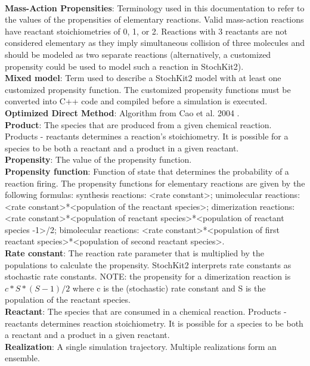 \documentclass[11pt,letterpaper]{article}
\begin{document}
\\\textbf{Mass-Action Propensities}: Terminology used in this documentation to refer to the values of the propensities of elementary reactions.  Valid mass-action reactions have reactant stoichiometries of 0, 1, or 2.  Reactions with 3 reactants are not considered elementary as they imply simultaneous collision of three molecules and should be modeled as two separate reactions (alternatively, a customized propensity could be used to model such a reaction in StochKit2).
    \\\textbf{Mixed model}: Term used to describe a StochKit2 model with at least one customized propensity function.  The customized propensity functions must be converted into C++ code and compiled before a simulation is executed.
    \\\textbf{Optimized Direct Method}: Algorithm from Cao et al. 2004 \cite{Cao2004}. 
    \\\textbf{Product}: The species that are produced from a given chemical reaction.  Products - reactants determines a reaction's stoichiometry.  It is possible for a species to be both a reactant and a product in a given reactant.
    \\\textbf{Propensity}: The value of the propensity function.
    \\\textbf{Propensity function}: Function of state that determines the probability of a reaction firing.  The propensity functions for elementary reactions are given by the following formulas: synthesis reactions: <rate constant>; unimolecular reactions: <rate constant>*<population of the reactant species>; dimerization reactions: <rate constant>*<population of reactant species>*<population of reactant species -1>/2; bimolecular reactions: <rate constant>*<population of first reactant species>*<population of second reactant species>.
    \\\textbf{Rate constant}: The reaction rate parameter that is multiplied by the populations to calculate the propensity.  StochKit2 interprets rate constants as stochastic rate constants.  NOTE: the propensity for a dimerization reaction is $c*S*(S-1)/2$ where c is the (stochastic) rate constant and S is the population of the reactant species.
    \\\textbf{Reactant}: The species that are consumed in a chemical reaction.  Products - reactants determines reaction stoichiometry.  It is possible for a species to be both a reactant and a product in a given reactant.
    \\\textbf{Realization}: A single simulation trajectory.  Multiple realizations form an ensemble.
\end{document}
